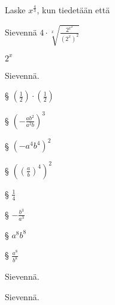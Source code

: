 \begin{tehtavasivu}
    \begin{tehtava}
Laske $x^{\frac{4}{3}}$, kun tiedetään että
\begin{vastaus}
\end{vastaus}
    \end{tehtava}
 
 \begin{tehtava}
Sievennä 
$4 \cdot \sqrt[x]{\frac{2^{x^2}}{(2^x)^2}}$
\begin{vastaus}
$2^x$
\end{vastaus}

 \end{tehtava}

 \begin{tehtava}
        Sievennä. 
       
§ $(\frac{1}{2})\cdot(\frac{1}{2})$ 
       
§ $(-\frac{ab^2}{a^2b})^3$ 
       
§ $(-a^4b^4)^2$ 
       
§ $\left((\frac{a}{b})^4\right)^2$
        
        \begin{vastaus}
           
§ $\frac{1}{4}$ 
           
§ $-\frac{b^3}{a^3}$ 
           
§ $a^8b^8$ 
           
§ $\frac{a^8}{b^8}$
        \end{vastaus}
    \end{tehtava}
\begin{tehtava}
Sievennä.

\begin{vastaus}
\end{vastaus}
\end{tehtava}

\begin{tehtava}
Sievennä.

\begin{vastaus}
\end{vastaus}
\end{tehtava}


\end{tehtavasivu}
